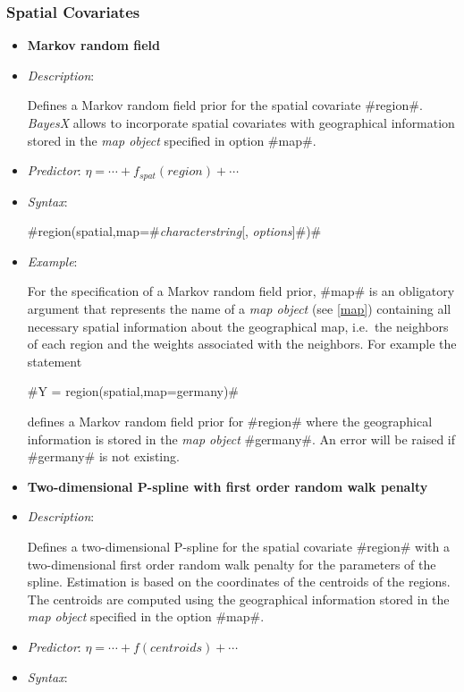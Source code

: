 \subsubsection*{Spatial Covariates}

\begin{itemize}
\item[]{\bf\sffamily Markov random field}

\item[] {\em Description}:

Defines a Markov random field prior for the spatial covariate
#region#. {\em BayesX} allows to incorporate spatial covariates
with geographical information stored in the {\em map object}
specified in option #map#.
\item[] {\em Predictor}: $\eta = \cdots
+ f_{spat}(region) + \cdots$ \item[] {\em Syntax}:

#region(spatial,map=#{\em characterstring}[, {\em options}]#)#
\item[] {\em Example}:

For the specification of a Markov random field prior, #map# is an
obligatory argument that represents the name of a {\em map object}
(see \autoref{map}) containing all necessary spatial information
about the geographical map, i.e.~the neighbors of each region and
the weights associated with the neighbors. For example the
statement

#Y = region(spatial,map=germany)#

defines a Markov random field prior for #region# where the
geographical information is stored in the {\em map object}
#germany#. An error will be raised if #germany# is not existing.

\item[]{\bf\sffamily Two-dimensional P-spline with first order
random walk penalty}

\item[] {\em Description}:

Defines a two-dimensional P-spline for the spatial covariate
#region# with a two-dimensional first order random walk penalty
for the parameters of the spline. Estimation is based on the
coordinates of the centroids of the regions. The centroids are
computed using the geographical information stored in the {\em map
object} specified in the option #map#.
\item[] {\em Predictor}:
$\eta= \cdots + f(centroids) + \cdots$ \item[] {\em Syntax}:


\end{itemize}
